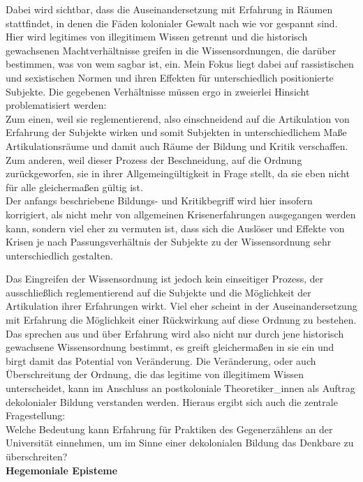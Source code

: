 Dabei wird sichtbar, dass die Auseinandersetzung mit Erfahrung
in Räumen stattfindet, in denen die Fäden kolonialer Gewalt nach wie vor
gespannt sind. Hier wird legitimes von illegitimem Wissen getrennt und die
historisch gewachsenen Machtverhältnisse greifen in die Wissensordnungen, die
darüber bestimmen, was von wem sagbar ist, ein. Mein Fokus liegt dabei auf
rassistischen und sexistischen Normen und ihren Effekten für unterschiedlich
positionierte Subjekte. Die gegebenen Verhältnisse müssen ergo in zweierlei
Hinsicht problematisiert werden:\\
 Zum einen, weil sie reglementierend, also
einschneidend auf die Artikulation von Erfahrung der Subjekte wirken und somit
Subjekten in unterschiedlichem Maße Artikulationsräume und damit auch Räume der
Bildung und Kritik verschaffen. Zum anderen, weil dieser Prozess der
Beschneidung, auf die Ordnung zurückgeworfen, sie in ihrer Allgemeingültigkeit
in Frage stellt, da sie eben nicht für alle gleichermaßen gültig ist. \\
Der
anfangs beschriebene Bildungs- und Kritikbegriff wird hier insofern korrigiert,
als nicht mehr von allgemeinen Krisenerfahrungen ausgegangen werden kann,
sondern viel eher zu vermuten ist, dass sich die Auslöser und Effekte von Krisen
je nach Passungsverhältnis der Subjekte zu der Wissensordnung sehr
unterschiedlich gestalten.

Das Eingreifen der Wissensordnung ist jedoch kein einseitiger Prozess, der
ausschließlich reglementierend auf die Subjekte und die Möglichkeit der
Artikulation ihrer Erfahrungen wirkt. Viel eher scheint in der
Auseinandersetzung mit Erfahrung die Möglichkeit einer Rückwirkung auf diese
Ordnung zu bestehen. \\
Das sprechen aus und über Erfahrung wird also nicht nur
durch jene historisch gewachsene Wissensordnung bestimmt, es greift
gleichermaßen in sie ein und birgt damit das Potential von Veränderung. Die
Veränderung, oder auch Überschreitung der Ordnung, die das legitime von
illegitimem Wissen unterscheidet, kann im Anschluss an postkoloniale
Theoretiker\_innen als Auftrag dekolonialer Bildung verstanden werden. Hieraus
ergibt sich auch die zentrale Fragestellung: \\
Welche Bedeutung kann Erfahrung für
Praktiken des Gegenerzählens an der Universität einnehmen, um im Sinne einer
dekolonialen Bildung das Denkbare zu überschreiten?\\

\textbf{\large Hegemoniale Episteme}\\

